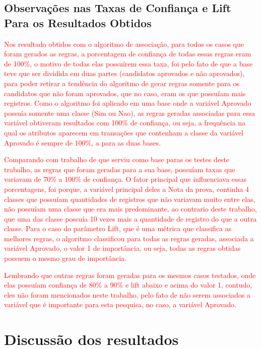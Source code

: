 \subsection{Observações nas Taxas de Confiança e Lift Para os Resultados Obtidos}

\par
\textcolor{red}{Nos resultado obtidos com o algoritmo de associação, para todos os casos que foram gerados as regras, a porcentagem de confiança de todas essas regras eram de 100\%, o motivo de todas elas possuírem essa taxa, foi pelo fato de que a base teve que ser dividida em duas partes (candidatos aprovados e não aprovados), para poder retirar a tendência  do algoritmo de gerar regras somente para os candidatos que não foram aprovados, que no caso, eram os que possuíam mais registros. Como o algoritmo foi aplicado em uma base onde a variável Aprovado possuía somente uma classe (Sim ou Nao), as regras geradas associadas para essa variável obtiveram resultados com 100\% de confiança, ou seja, a frequência na qual os atributos aparecem em transações que contenham a classe da variável Aprovado é sempre de 100\%, a para as duas bases. }

\par
\textcolor{red}{Comparando com trabalho de  que serviu como base paras os testes deste trabalho, as regras que foram geradas para a sua base, possuíam taxas que variavam de 70\% a 100\% de confiança. O fator principal que influenciava essas porcentagens, foi porque, a variável principal deles a Nota da prova, continha 4 classes que possuíam quantidades de registros que não variavam muito entre elas, não possuíam uma classe que era mais predominante, ao contrario deste trabalho, que uma das classe possuía 10 vezes mais a quantidade de registro do que a outra classe. Para o caso do parâmetro Lift, que é uma métrica que classifica as melhores regras, o algoritmo classificou para todas as regras geradas, associada a variável Aprovado, o valor 1 de importância, ou seja, todas as regras obtidas possuem o mesmo grau de importância.}

\par
\textcolor{red}{Lembrando que outras regras foram geradas para os mesmos casos testados, onde elas possuíam confiança de 80\% a 90\% e lift abaixo e acima do valor 1, contudo, eles não foram mencionados neste trabalho, pelo fato de não serem associados a variável que é importante para esta pesquisa, no caso, a variável Aprovado.}

\section{Discussão dos resultados}

